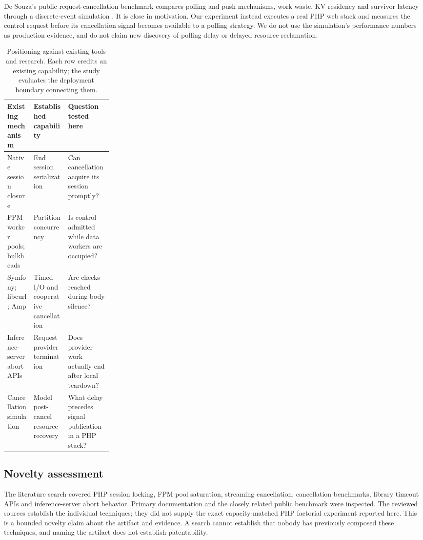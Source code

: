 \documentclass[11pt,a4paper]{article}
\begin{document}
De Souza's public request-cancellation benchmark compares polling and push mechanisms, work waste, KV residency and survivor latency through a discrete-event simulation \cite{desouza}. It is close in motivation. Our experiment instead executes a real PHP web stack and measures the control request before its cancellation signal becomes available to a polling strategy. We do not use the simulation's performance numbers as production evidence, and do not claim new discovery of polling delay or delayed resource reclamation.

\begin{table}[t]
\centering\small
\begin{tabularx}{\linewidth}{@{}p{0.25\linewidth}XX@{}}
\toprule
Existing mechanism & Established capability & Question tested here\\\midrule
Native session closure & End session serialization & Can cancellation acquire its session promptly?\\
FPM worker pools; bulkheads & Partition concurrency & Is control admitted while data workers are occupied?\\
Symfony; libcurl; Amp & Timed I/O and cooperative cancellation & Are checks reached during body silence?\\
Inference-server abort APIs & Request provider termination & Does provider work actually end after local teardown?\\
Cancellation simulation & Model post-cancel resource recovery & What delay precedes signal publication in a PHP stack?\\\bottomrule
\end{tabularx}
\caption{Positioning against existing tools and research. Each row credits an existing capability; the study evaluates the deployment boundary connecting them.}
\label{tab:prior}
\end{table}

\subsection{Novelty assessment}
The literature search covered PHP session locking, FPM pool saturation, streaming cancellation, cancellation benchmarks, library timeout APIs and inference-server abort behavior. Primary documentation and the closely related public benchmark were inspected. The reviewed sources establish the individual techniques; they did not supply the exact capacity-matched PHP factorial experiment reported here. This is a bounded novelty claim about the artifact and evidence. A search cannot establish that nobody has previously composed these techniques, and naming the artifact does not establish patentability.
\end{document}

